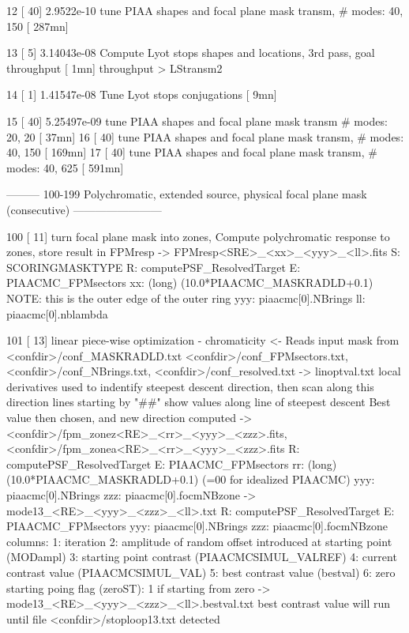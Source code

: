 \begin{DoxyVerb}
\begin{DoxyVerb}
\begin{DoxyVerb}
 12     [ 40]   2.9522e-10  tune PIAA shapes and focal plane mask transm, # modes: 40, 150          [ 287mn]

 13     [  5]   3.14043e-08 Compute Lyot stops shapes and locations, 3rd pass, goal throughput      [   1mn]
        throughput > LStransm2 
        
 14     [  1]   1.41547e-08 Tune Lyot stops conjugations                                            [   9mn]
        
 15     [ 40]   5.25497e-09 tune PIAA shapes and focal plane mask transm # modes: 20, 20            [  37mn]
 16     [ 40]    tune PIAA shapes and focal plane mask transm, # modes: 40, 150             [ 169mn]
 17     [ 40]   tune PIAA shapes and focal plane mask transm, # modes: 40, 625              [ 591mn]




--------- 100-199  Polychromatic, extended source, physical focal plane mask (consecutive) ------------------------

100 [ 11]   turn focal plane mask into zones, Compute polychromatic response to zones, store result in FPMresp
        -> FPMresp<SRE>_<xx>_<yyy>_<ll>.fits
            S:   SCORINGMASKTYPE
            R:   computePSF_ResolvedTarget
            E:   PIAACMC_FPMsectors
            xx: (long) (10.0*PIAACMC_MASKRADLD+0.1)  NOTE: this is the outer edge of the outer ring
            yyy: piaacmc[0].NBrings
            ll:  piaacmc[0].nblambda

101 [ 13]   linear piece-wise optimization - chromaticity
        <- Reads input mask from <confdir>/conf_MASKRADLD.txt <confdir>/conf_FPMsectors.txt, <confdir>/conf_NBrings.txt, <confdir>/conf_resolved.txt
        -> linoptval.txt
            local derivatives used to indentify steepest descent direction, then scan along this direction
            lines starting by "##" show values along line of steepest descent
            Best value then chosen, and new direction computed
        -> <confdir>/fpm_zonez<RE>_<rr>_<yyy>_<zzz>.fits,  <confdir>/fpm_zonea<RE>_<rr>_<yyy>_<zzz>.fits
            R:   computePSF_ResolvedTarget
            E:   PIAACMC_FPMsectors
            rr:  (long) (10.0*PIAACMC_MASKRADLD+0.1)    (=00 for idealized PIAACMC) 
            yyy: piaacmc[0].NBrings
            zzz: piaacmc[0].focmNBzone          
        -> mode13_<RE>_<yyy>_<zzz>_<ll>.txt
            R:   computePSF_ResolvedTarget
            E:   PIAACMC_FPMsectors         
            yyy: piaacmc[0].NBrings
            zzz: piaacmc[0].focmNBzone
        columns:
            1: iteration
            2: amplitude of random offset introduced at starting point (MODampl)
            3: starting point contrast (PIAACMCSIMUL_VALREF)
            4: current contrast value (PIAACMCSIMUL_VAL)
            5: best contrast value (bestval)
            6: zero starting poing flag (zeroST): 1 if starting from zero
        -> mode13_<RE>_<yyy>_<zzz>_<ll>.bestval.txt
            best contrast value
    will run until file <confdir>/stoploop13.txt detected   






\end{DoxyVerb}
\end{DoxyVerb}
\end{DoxyVerb}
